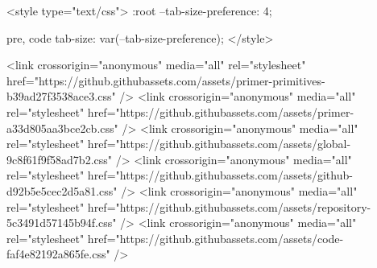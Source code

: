   <style type="text/css">
    :root {
      --tab-size-preference: 4;
    }

    pre, code {
      tab-size: var(--tab-size-preference);
    }
  </style>

    <link crossorigin="anonymous" media="all" rel="stylesheet" href="https://github.githubassets.com/assets/primer-primitives-b39ad27f3538ace3.css" />
    <link crossorigin="anonymous" media="all" rel="stylesheet" href="https://github.githubassets.com/assets/primer-a33d805aa3bce2cb.css" />
    <link crossorigin="anonymous" media="all" rel="stylesheet" href="https://github.githubassets.com/assets/global-9c8f61f9f58ad7b2.css" />
    <link crossorigin="anonymous" media="all" rel="stylesheet" href="https://github.githubassets.com/assets/github-d92b5e5cec2d5a81.css" />
  <link crossorigin="anonymous" media="all" rel="stylesheet" href="https://github.githubassets.com/assets/repository-5c3491d57145b94f.css" />
<link crossorigin="anonymous" media="all" rel="stylesheet" href="https://github.githubassets.com/assets/code-faf4e82192a865fe.css" />

  

